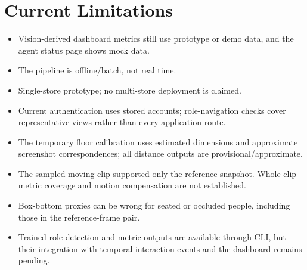 \section{Current Limitations}
\begin{itemize}
\item Vision-derived dashboard metrics still use prototype or demo data, and the agent status page shows mock data.
\item The pipeline is offline/batch, not real time.
\item Single-store prototype; no multi-store deployment is claimed.
\item Current authentication uses stored accounts; role-navigation checks cover representative views rather than every application route.
\item The temporary floor calibration uses estimated dimensions and approximate screenshot correspondences; all distance outputs are provisional/approximate.
\item The sampled moving clip supported only the reference snapshot. Whole-clip metric coverage and motion compensation are not established.
\item Box-bottom proxies can be wrong for seated or occluded people, including those in the reference-frame pair.
\item Trained role detection and metric outputs are available through CLI, but their integration with temporal interaction events and the dashboard remains pending.
\end{itemize}
